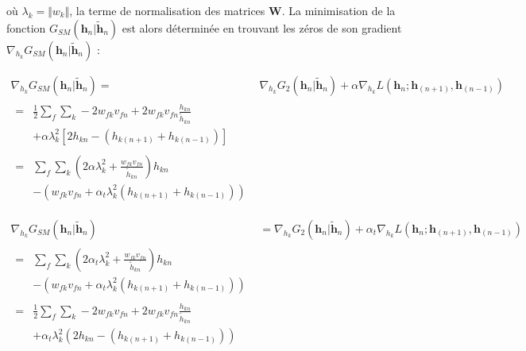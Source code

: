 où $\lambda_k = \Vert w_k \Vert$, la terme de normalisation des matrices $\mathbf{W}$. La minimisation de la fonction $G_{SM}(\mathbf{h}_{n}\vert \mathbf{\tilde{h}}_{n})$ est alors déterminée en trouvant les zéros de son gradient $\nabla_{h_k} G_{SM}(\mathbf{h}_{n}\vert \mathbf{\tilde{h}}_{n})$ :


\begin{align}
\nabla_{h_{k}} G_{SM}(\mathbf{h}_{n}\vert \mathbf{\tilde{h}}_{n}) ={}& \nabla_{h_{k}} G_{2}(\mathbf{h}_{n}\vert \mathbf{\tilde{h}}_{n}) + \alpha \nabla_{h_{k}} L(\mathbf{h}_{n}; \mathbf{h}_{(n+1)}, \mathbf{h}_{(n-1)})\\
\begin{split}
 ={}& \frac{1}{2}\sum_{f} \sum_{k} -2 w_{fk} v_{fn} + 2 w_{fk} v_{fn} \frac{h_{kn}}{\tilde{h}_{kn}} \\
 & + \alpha \lambda_k^2 \left[ 2 h_{kn}- (h_{k(n+1)}+h_{k(n-1)}) \right]
 \end{split}\\
\begin{split}
 ={}& \sum_{f} \sum_{k} \left( 2\alpha \lambda_k^2 + \frac{w_{fk} v_{fn}} {\tilde{h}_{kn}}\right)h_{kn} \\
 & - \left(w_{fk} v_{fn} + \alpha_t  \lambda_k^2 \left(h_{k(n+1)}+h_{k(n-1)}\right)\right) 
\end{split}\label{eq:smooth_1}
\end{align}

\begin{align}
\nabla_{h_{k}} G_{SM}(\mathbf{h}_{n}\vert \mathbf{\tilde{h}}_{n}) &= \nabla_{h_{k}} G_{2}(\mathbf{h}_{n}\vert \mathbf{\tilde{h}}_{n}) + \alpha_t \nabla_{h_{k}} L(\mathbf{h}_{n}; \mathbf{h}_{(n+1)}, \mathbf{h}_{(n-1)})\\
\begin{split}
    ={}& \sum_{f} \sum_{k} \left( 2\alpha_t \lambda_k^2 + \frac{w_{fk} v_{fn}}{\tilde{h}_{kn}}\right)h_{kn} \\
    & - \left(w_{fk} v_{fn} + \alpha_t \lambda_k^2 \left(h_{k(n+1)}+h_{k(n-1)}\right)\right) 
    \end{split}\label{eq:smooth_2}\\
\begin{split}
    ={}& \frac{1}{2}\sum_{f} \sum_{k} -2 w_{fk} v_{fn} + 2 w_{fk} v_{fn} \frac{h_{kn}}{\tilde{h}_{kn}} \\
    & + \alpha_t \lambda_k^2 \left( 2 h_{kn}- (h_{k(n+1)}+h_{k(n-1)}) \right)
\end{split}
\end{align}



